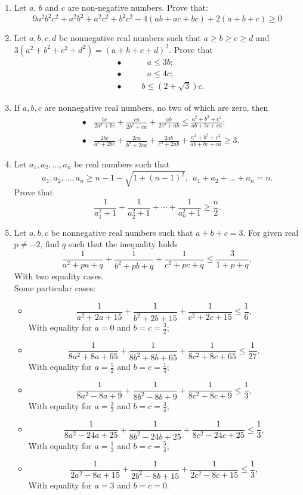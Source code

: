\documentclass{article}
\begin{document}
\begin{enumerate}
\item  Let $a$, $b$ and $c$ are non-negative numbers. Prove that:
\[9a^2b^2c^2+a^2b^2+a^2c^2+b^2c^2-4(ab+ac+bc)+2(a+b+c)\geq0\]

\item  Let $ a,b,c,d$ be nonnegative real numbers such that $ a\ge b\ge c\ge d$ and
$\displaystyle 3(a^2 + b^2 + c^2 + d^2) = (a + b + c + d)^2$. Prove that
\[\begin{aligned} &\bullet \ \ \ \ \ \ \ \ \ \ \ \ \ \ a\le 3b;\\& \bullet \ \ \ \ \ \ \ \ \ \ \ \ \ \ a\le 4c;\\&\bullet \ \ \ \ \ \ \ \ \ \ \ b\le (2 + \sqrt 3)c.\end{aligned}\]

\item  If $ a,b,c$ are nonnegative real numbers, no two of which are zero, then
\[\begin{aligned}&\bullet \ \ \ \ \frac  {bc}{2a^2+bc}+\frac  {ca}{2b^2+ca}+\frac  {ab}{2c^2+ab}\le \frac {a^2+b^2+c^2}{ab+bc+ca};\\& \bullet \ \ \ \  \frac  {2bc}{a^2+2bc}+\frac  {2ca}{b^2+2ca}+\frac  {2ab}{c^2+2ab}+\frac {a^2+b^2+c^2}{ab+bc+ca}\ge 3.\end{aligned}\]

\item  Let $ a_1,a_2,...,a_n$ be real numbers such that
\[ a_1,a_2,...,a_n\ge n - 1 - \sqrt {1+(n-1)^2 }, \ \ a_1 + a_2 + ... + a_n = n.\]
Prove that
\[ \frac  1{a_1^2+1} + \frac  1{a_2^2+1} + \cdots + \frac  1{a_n^2+1}\ge \frac  n{2}.\]
 \item  Let $ a,b,c$ be nonnegative real numbers such that $ a+b+c=3$. For given real $ p\neq -2$, find $ q$ such that the inequality holds
\[ \frac  1{a^2+pa+q}+\frac  1{b^2+pb+q}+\frac  1{c^2+pc+q}\le \frac  3{1+p+q},\]
With two equality cases.\\
Some particular cases: 
\begin{itemize}
	\item \[\frac  1{a^2+2a+15}+\frac  1{b^2+2b+15}+\frac  1{c^2+2c+15}\le  \frac  1{6},\]
With equality for $ a=0$ and $ b=c=\frac  3{2}$;
	\item \[\frac  1{8a^2+8a+65}+\frac  1{8b^2+8b+65}+\frac  1{8c^2+8c+65}\le  \frac  1{27},\]
With equality for $ a=\frac  5{2}$ and $ b=c=\frac  1{4}$;
	\item\[\frac  1{8a^2-8a+9}+\frac  1{8b^2-8b+9}+\frac  1{8c^2-8c+9}\le  \frac  1{3},\]
With equality for $ a=\frac  3{2}$ and $ b=c=\frac  3{4}$;
	\item \[\frac  1{8a^2-24a+25}+\frac  1{8b^2-24b+25}+\frac  1{8c^2-24c+25}\le  \frac  1{3},\]
With equality for $ a=\frac  1{2}$ and $ b=c=\frac  5{4}$;
	\item \[\frac  1{2a^2-8a+15}+\frac  1{2b^2-8b+15}+\frac  1{2c^2-8c+15}\le  \frac  1{3},\]
With equality for $ a=3$ and $ b=c=0$.
\end{itemize}


\end{enumerate}
\end{document}
